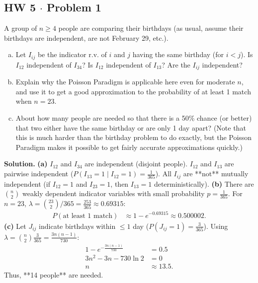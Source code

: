 \documentclass[11pt,a4paper]{article}
\begin{document}
\subsection{HW 5 $\cdot$ Problem 1}
\begin{tcolorbox}[title={HW 5 $\cdot$ Problem 1}]
A group of $n \ge 4$ people are comparing their birthdays (as usual, assume their birthdays are independent, are not February 29, etc.).
\begin{enumerate}[(a)]
\item Let $I_{ij}$ be the indicator r.v. of $i$ and $j$ having the same birthday (for $i < j$). Is $I_{12}$ independent of $I_{34}$? Is $I_{12}$ independent of $I_{13}$? Are the $I_{ij}$ independent?
\item Explain why the Poisson Paradigm is applicable here even for moderate $n$, and use it to get a good approximation to the probability of at least 1 match when $n = 23$.
\item About how many people are needed so that there is a 50\% chance (or better) that two either have the same birthday or are only 1 day apart? (Note that this is much harder than the birthday problem to do exactly, but the Poisson Paradigm makes it possible to get fairly accurate approximations quickly.)
\end{enumerate}
\end{tcolorbox}

\noindent \textbf{Solution.} \textbf{(a)} $I_{12}$ and $I_{34}$ are independent (disjoint people). $I_{12}$ and $I_{13}$ are pairwise independent ($P(I_{13}=1 \mid I_{12}=1) = \frac{1}{365}$). All $I_{ij}$ are **not** mutually independent (if $I_{12}=1$ and $I_{23}=1$, then $I_{13}=1$ deterministically).
\textbf{(b)} There are $\binom{n}{2}$ weakly dependent indicator variables with small probability $p = \frac{1}{365}$. For $n = 23$, $\lambda = \binom{23}{2} / 365 = \frac{253}{365} \approx 0.69315$:
\begin{align*}
P(\text{at least 1 match}) &\approx 1 - e^{-0.69315} \approx 0.500002.
\end{align*}
\textbf{(c)} Let $J_{ij}$ indicate birthdays within $\le 1$ day ($P(J_{ij} = 1) = \frac{3}{365}$). Using $\lambda = \binom{n}{2} \frac{3}{365} = \frac{3n(n-1)}{730}$:
\begin{align*}
1 - e^{-\frac{3n(n-1)}{730}} &= 0.5 \\
3n^2 - 3n - 730 \ln 2 &= 0 \\
n &\approx 13.5.
\end{align*}
Thus, **14 people** are needed.
\end{document}
